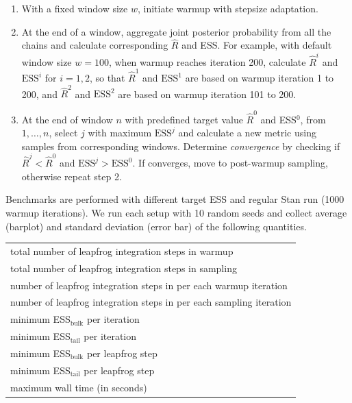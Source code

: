 \documentclass[landscape,a0paper,fontscale=0.45]{baposter} %
\begin{document}
\begin{poster}
{\begin{multicols}{2}
\begin{enumerate}
\item With a fixed window size \(w\), initiate warmup with stepsize adaptation.
\item At the end of a window, aggregate joint posterior probability from all the chains and calculate corresponding \(\hat{R}\) and ESS. 
For example, with default window size \(w=100\), when warmup reaches iteration 200, calculate
\(\hat{R}^i\) and \(\text{ESS}^i\) for \(i=1, 2\), so that
\(\hat{R}^1\) and \(\text{ESS}^1\) are based on warmup iteration 1 to
200, and \(\hat{R}^2\) and \(\text{ESS}^2\) are based on warmup iteration 101 to 200.
\item At the end of window \(n\) with predefined target value
  \(\hat{R}^{0}\) and ESS\(^{0}\), from \({1, \dots, n}\), select \(j\) with maximum $\text{ESS}^j$
and calculate a new metric using samples from corresponding
windows. Determine \emph{convergence} by checking if $\hat{R}^j < \hat{R}^0$ and $\text{ESS}^j > \text{ESS}^0$. 
If converges, move to post-warmup sampling, otherwise repeat step 2.
\end{enumerate}


\vspace{1em}
Benchmarks are performed with different target ESS and
regular Stan run (1000 warmup iterations).
We run each setup with 10 random seeds and collect average (barplot) and
standard deviation (error bar) of the following quantities.
\begin{center}
\footnotesize
\begin{tabular}{l}
\hline
total number of leapfrog integration steps in warmup \\
total number of leapfrog integration steps in sampling \\
number of leapfrog integration steps in per each warmup iteration \\
number of leapfrog integration steps in per each sampling iteration \\
minimum ESS\(_{\text{bulk}}\) per iteration \\
minimum ESS\(_{\text{tail}}\) per iteration \\
minimum ESS\(_{\text{bulk}}\) per leapfrog step \\
minimum ESS\(_{\text{tail}}\) per leapfrog step \\
maximum wall time (in seconds) \\
\hline
\end{tabular}
\end{center}


\end{multicols}}
\end{poster}
\end{document}
